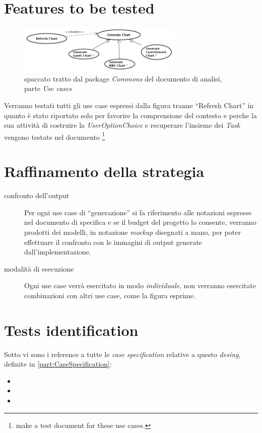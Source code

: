 \section{Features to be tested}
\label{sec:GenerateChart}
\begin{figure}[h!] 
\centering 
\includegraphics[width=0.7\textwidth]{desing_spec/GenerateChart.png}
\caption{spaccato tratto dal package \emph{Commons} del documento di analisi,
parte \emph{Use cases}}

\end{figure}
Verranno testati tutti gli use case espressi dalla figura tranne ``Refresh
Chart'' in quanto \`e stato riportato solo per favorire la comprensione del
contesto e perche la sua attivit\`a di costruire la \emph{UserOptionChoice} e
recuperare l'insieme dei \emph{Task} vengono testate nel documento
\footnote{make a test document for these use cases.}

\section{Raffinamento della strategia}
\begin{description}
  \item[confronto dell'output] Per ogni use case di ``generazione'' si
  fa riferimento alle notazioni espresse nel documento di specifica e se
  il budget del progetto lo consente, verranno prodotti dei modelli, in
  notazione \emph{mockup} disegnati a mano, per poter effettuare il confronto 
  con le immagini di output generate dall'implementazione.
  \item[modalit\`a di esecuzione] Ogni use case verr\`a esercitato in modo 
  \emph{individuale}, non verranno esercitate combinazioni con altri use case,
  come la figura esprime.
\end{description}

\section{Tests identification}
\label{sec:GenerateChartTestIdentification}
Sotto vi sono i reference a tutte le \emph{case specification} relative a
questo \emph{desing}, definite in \ref{part:CaseSpecification}:
\begin{itemize}
  \item {}
  \item {}
  \item {}
\end{itemize}

